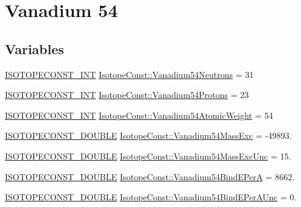 \hypertarget{group___isotope_const-_vanadium-_v54}{}\section{Vanadium 54}
\label{group___isotope_const-_vanadium-_v54}
\subsection*{Variables}
\begin{DoxyCompactItemize}
\item 
\mbox{\hyperlink{group___isotope_const-_macros_ga5f18360b3e99483a35c32d789e62621c}{I\+S\+O\+T\+O\+P\+E\+C\+O\+N\+S\+T\+\_\+\+I\+NT}} \mbox{\hyperlink{group___isotope_const-_vanadium-_v54_ga43627b6e01b540e247bccadeb2d44781}{Isotope\+Const\+::\+Vanadium54\+Neutrons}} = 31
\item 
\mbox{\hyperlink{group___isotope_const-_macros_ga5f18360b3e99483a35c32d789e62621c}{I\+S\+O\+T\+O\+P\+E\+C\+O\+N\+S\+T\+\_\+\+I\+NT}} \mbox{\hyperlink{group___isotope_const-_vanadium-_v54_ga96a1e461c56c0c053e5e6a05caad98d5}{Isotope\+Const\+::\+Vanadium54\+Protons}} = 23
\item 
\mbox{\hyperlink{group___isotope_const-_macros_ga5f18360b3e99483a35c32d789e62621c}{I\+S\+O\+T\+O\+P\+E\+C\+O\+N\+S\+T\+\_\+\+I\+NT}} \mbox{\hyperlink{group___isotope_const-_vanadium-_v54_gacb2a74adb265f35b553c96acb8f5ffcc}{Isotope\+Const\+::\+Vanadium54\+Atomic\+Weight}} = 54
\item 
\mbox{\hyperlink{group___isotope_const-_macros_ga8f45a7272ce02c0b4c65c44636ed719a}{I\+S\+O\+T\+O\+P\+E\+C\+O\+N\+S\+T\+\_\+\+D\+O\+U\+B\+LE}} \mbox{\hyperlink{group___isotope_const-_vanadium-_v54_ga50002f35027e7ab0e44b20a0419a96f8}{Isotope\+Const\+::\+Vanadium54\+Mass\+Exc}} = -\/49893.
\item 
\mbox{\hyperlink{group___isotope_const-_macros_ga8f45a7272ce02c0b4c65c44636ed719a}{I\+S\+O\+T\+O\+P\+E\+C\+O\+N\+S\+T\+\_\+\+D\+O\+U\+B\+LE}} \mbox{\hyperlink{group___isotope_const-_vanadium-_v54_gaf52558c54bfece737058f0924f003543}{Isotope\+Const\+::\+Vanadium54\+Mass\+Exc\+Unc}} = 15.
\item 
\mbox{\hyperlink{group___isotope_const-_macros_ga8f45a7272ce02c0b4c65c44636ed719a}{I\+S\+O\+T\+O\+P\+E\+C\+O\+N\+S\+T\+\_\+\+D\+O\+U\+B\+LE}} \mbox{\hyperlink{group___isotope_const-_vanadium-_v54_gae66124373a3ab6523fb1406b4196c111}{Isotope\+Const\+::\+Vanadium54\+Bind\+E\+PerA}} = 8662.
\item 
\mbox{\hyperlink{group___isotope_const-_macros_ga8f45a7272ce02c0b4c65c44636ed719a}{I\+S\+O\+T\+O\+P\+E\+C\+O\+N\+S\+T\+\_\+\+D\+O\+U\+B\+LE}} \mbox{\hyperlink{group___isotope_const-_vanadium-_v54_ga72417630f0f82e48bcbffb2e4b87a719}{Isotope\+Const\+::\+Vanadium54\+Bind\+E\+Per\+A\+Unc}} = 0.

\end{DoxyCompactItemize}
